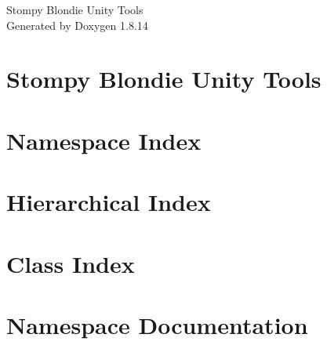 \documentclass[twoside]{book}
\newcommand{\+}{\discretionary{\mbox{\scriptsize$\hookleftarrow$}}{}{}}
\newcommand{\clearemptydoublepage}{%
  \newpage{\pagestyle{empty}\cleardoublepage}%
}
\begin{document}
\hypersetup{pageanchor=false,
             bookmarksnumbered=true,
             pdfencoding=unicode
            }
\begin{titlepage}
\vspace*{7cm}
\begin{center}%
{\Large Stompy Blondie Unity Tools }\\
\vspace*{1cm}
{\large Generated by Doxygen 1.8.14}\\
\end{center}
\end{titlepage}
\clearemptydoublepage
{}
\tableofcontents
\clearemptydoublepage
{}
\hypersetup{pageanchor=true}

\chapter{Stompy Blondie Unity Tools}
\label{md__r_e_a_d_m_e}

\chapter{Namespace Index}

\chapter{Hierarchical Index}

\chapter{Class Index}

\chapter{Namespace Documentation}










\end{document}
